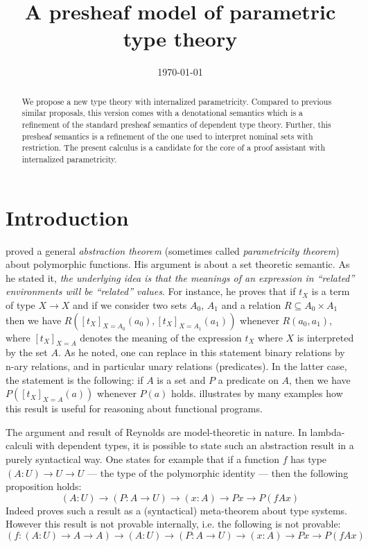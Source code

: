 \documentclass[english]{PaperTools/latex/lipics}
\title{A presheaf model of parametric type theory}
\author{}
\date{\today}
\begin{document}
\maketitle

\begin{abstract}
  We propose a new type theory with internalized
  parametricity. Compared to previous similar proposals, this version
  comes with a denotational semantics which is a refinement of the
  standard presheaf semantics of dependent type theory. Further, this
  presheaf semantics is a refinement of the one used to interpret
  nominal sets with restriction.  The present calculus is a candidate for the
  core of a proof assistant with internalized parametricity.
\end{abstract}

\section{Introduction}
\cite{reynolds_types_1983} proved a general \emph{abstraction theorem} (sometimes called
\emph{parametricity theorem}) about polymorphic functions. His argument is
about a set theoretic semantic.  As he stated it, {\em the underlying
  idea is that the meanings of an expression in ``related''
  environments will be ``related'' values}.  For instance, he proves
that if $t_X$ is a term of type $X → X$ and if we consider two sets
$A_0$, $A_1$ and a relation $R ⊆ A_0 × A_1$ then we have
$R([t_X]_{X=A_0}(a_0),[t_X]_{X=A_1}(a_1))$ whenever $R(a_0,a_1)$,
where $[t_X]_{X=A}$ denotes the meaning of the expression $t_X$ where
$X$ is interpreted by the set $A$. As he noted, one can replace in
this statement binary relations by n-ary relations, and in particular
unary relations (predicates). In the latter case, the statement is the following:
if $A$ is a set and $P$ a predicate on $A$, then we have
$P([t_X]_{X=A}(a))$ whenever $P(a)$ holds.
\cite{wadler_theorems_1989} illustrates by many examples how this
result is useful for reasoning about functional programs.

The argument and result of Reynolds are model-theoretic in nature.
In lambda-calculi with dependent types, it is possible to state such an
abstraction result in a purely syntactical way.
One states for example that if a function $f$ has type
$(A : U) → U → U$ --- the type of the polymorphic identity --- then the
following proposition holds:
$$ (A : U) → (P : A → U) → (x : A) → P x → P (f A x) $$
%
Indeed \citet{bernardy_proofs_2012} proves such a result as a
(syntactical) meta-theorem about type systems. However this result is
not provable internally, i.e. the following is not provable:
$$ (f : (A:U) → A → A) →  (A : U) → (P : A → U) → (x : A) → P x → P (f A x) $$
\end{document}
